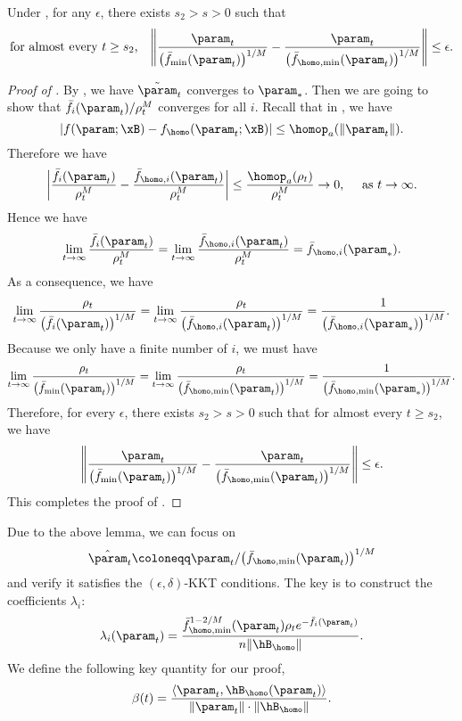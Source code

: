 \begin{lemma}
\label{lem:bound-of-two-min}
Under , for any $\epsilon$, there exists $s_2>s>0$ such that 
\[
\text{for almost every $t\ge s_2$,}\quad 
    \Bigg \| \frac{\param_t}{\big(\bar f_{\min}(\param_t)\big)^{1 / M}} - \frac{\param_t}{\big(\bar f_{\homo,\min}(\param_t)\big)^{1 / M}} \Bigg\| \le \epsilon.
\]
\end{lemma}
\begin{proof}[Proof of ]
By , we have $\tilde{\param}_t $ converges to $\param_*$.  Then we are going to show that 
$ \bar f_{i}( \param_t) / \rho_t^M$ converges for all $i$. Recall that in , we have 
\[
    |f(\param; \xB) - f_\homo(\param_t;\xB) | \le \homop_a(\|\param_t\|). 
\]
Therefore we have 
\[
    \bigg | \frac{\bar f_{i}(\param_t )}{\rho_t^M} - \frac{\bar f_{\homo,i}(\param_t )}{\rho_t^M} \bigg | \le \frac{\homop_a(\rho_t)}{\rho_t^M} \to 0, \quad  \text{ as } t\to \infty.
\]
Hence we have 
\[
    \lim_{t\to \infty} \frac{\bar f_{i}(\param_t )}{\rho_t^M} = \lim_{t\to \infty} \frac{\bar f_{\homo,i}(\param_t )}{\rho_t^M} = \bar f_{\homo,i}(\param_*).
\]
As a consequence, we have 
\[
    \lim_{t\to \infty} \frac{\rho_t}{\big(\bar f_{i}(\param_t ) \big)^{1 / M}} = \lim_{t\to \infty} \frac{\rho_t}{\big(\bar f_{\homo,i}(\param_t ) \big)^{1 / M}} = \frac{1}{\big(\bar f_{\homo,i}(\param_*)\big)^{1 / M}}.
\]
Because we only have a finite number of $i$, we must have 
\[
    \lim_{t\to \infty} \frac{\rho_t}{\big(\bar f_{\min}(\param_t ) \big)^{1 / M}} = \lim_{t\to \infty} \frac{\rho_t}{\big(\bar f_{\homo,\min}(\param_t ) \big)^{1 / M}} = \frac{1}{\big(\bar f_{\homo,\min}(\param_*)\big)^{1 / M}}.
\]
Therefore, for every $\epsilon$, there exists $s_2>s>0$ such that for almost every $t\ge s_2$, we have 
\[
    \Bigg \| \frac{\param_t}{\big(\bar f_{\min}(\param_t)\big)^{1 / M}} - \frac{\param_t}{\big(\bar f_{\homo,\min}(\param_t)\big)^{1 / M}} \Bigg\| \le \epsilon.
\]
This completes the proof of .
\end{proof}

Due to the above lemma, we can focus on 
\[\hat \param_t \coloneqq \param_t  / \big(\bar f_{\homo,\min}(\param_t)\big)^{1 / M}\] 
and verify it satisfies the $(\epsilon, \delta)$-KKT conditions. The key is to construct the coefficients $\lambda_i$: 
\begin{equation}
\label{eq: lambda_i}
    \lambda_i(\param_t ) = \frac{\bar f_{\homo,\min}^{1-2 / M} (\param_t) \rho_t e^{-\bar f_i(\param_t )}}{n \|\hB_{\homo}\|}. 
\end{equation}
We define the following key quantity for our proof,
\begin{equation}
\label{eq: beta}
    \beta(t) = \frac{\langle \param_t , \hB_{\homo} (\param_t ) \rangle }{\| \param_t \|\cdot \|\hB_{\homo}\|}.
\end{equation}

